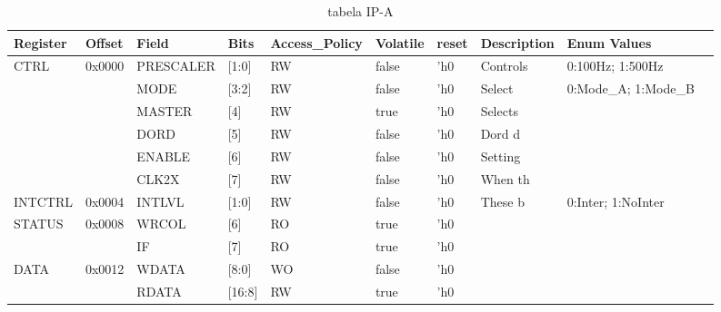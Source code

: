 \documentclass{article}
\begin{document}
\begin{table}[h]
\centering
\caption{tabela IP-A}
\label{table:IP-A}
\fontsize{7}{10}\selectfont %
\begin{tabular}{|l|l|l|l|l|l|l|l|l|l|}
\hline
\textbf{Register} & \textbf{Offset} & \textbf{Field} & \textbf{Bits} & \textbf{Access\_Policy} & \textbf{Volatile} & \textbf{reset} & \textbf{Description} & \textbf{Enum Values} \\ \hline
\multirow{6}{*}{CTRL} & \multirow{6}{*}{0x0000} & PRESCALER & [1:0]  & RW  & false & 'h0  & Controls & 0:100Hz; 1:500Hz       \\ \cline{3-9}
        &        & MODE      & [3:2]  & RW  & false & 'h0  & Select   & 0:Mode\_A; 1:Mode\_B   \\ \cline{3-9}
        &        & MASTER    & [4]    & RW  & true  & 'h0  & Selects  &                        \\ \cline{3-9}
        &        & DORD      & [5]    & RW  & false & 'h0  & Dord d   &                        \\ \cline{3-9}
        &        & ENABLE    & [6]    & RW  & false & 'h0  & Setting  &                        \\ \cline{3-9}  
        &        & CLK2X     & [7]    & RW  & false & 'h0  & When th  &                        \\ \hline  
INTCTRL & 0x0004 & INTLVL    & [1:0]  & RW  & false & 'h0  & These b  & 0:Inter; 1:NoInter     \\ \hline
\multirow{2}{*}{STATUS} & \multirow{2}{*}{0x0008} & WRCOL     & [6]    & RO  & true  & 'h0  &          &                        \\ \cline{3-9}
        &        & IF        & [7]    & RO  & true  & 'h0  &          &                        \\ \hline
\multirow{2}{*}{DATA} & \multirow{2}{*}{0x0012} & WDATA     & [8:0]  & WO  & false & 'h0  &          &                        \\ \cline{3-9}
        &        & RDATA     & [16:8] & RW  & true  & 'h0  &          &                        \\ \hline
\end{tabular}
\end{table}
\end{document}
